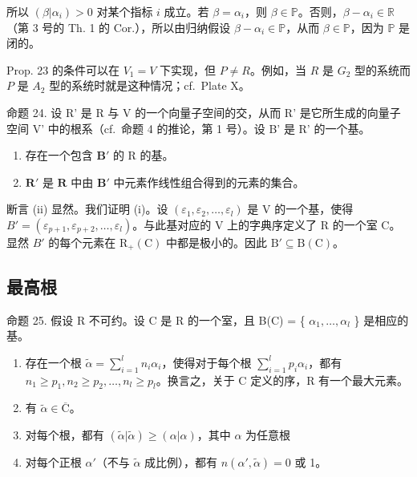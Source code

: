 所以 \((\beta |\alpha_{i}) > 0\) 对某个指标 \(i\) 成立。若 \(\beta = \alpha_{i}\)，则 \(\beta \in \mathbb{P}\)。否则，\(\beta - \alpha_{i} \in \mathbb{R}\)（第 3 号的 Th. 1 的 Cor.），所以由归纳假设 \(\beta - \alpha_{i} \in \mathbb{P}\)，从而 \(\beta \in \mathbb{P}\)，因为 \(\mathbb{P}\) 是闭的。

Prop. 23 的条件可以在 \(V_{1} = V\) 下实现，但 \(P \neq R\)。例如，当 \(R\) 是 \(G_{2}\) 型的系统而 \(P\) 是 \(A_{2}\) 型的系统时就是这种情况；cf.~Plate X。

命题 24. 设 R' 是 R 与 V 的一个向量子空间的交，从而 R' 是它所生成的向量子空间 V' 中的根系（cf.~命题 4 的推论，第 1 号）。设 B' 是 R' 的一个基。

\begin{enumerate}
\def\labelenumi{(\roman{enumi})}
\item
  存在一个包含 \(\mathbf{B}'\) 的 R 的基。
\item
  \(\mathbf{R}'\) 是 \(\mathbf{R}\) 中由 \(\mathbf{B}'\) 中元素作线性组合得到的元素的集合。
\end{enumerate}

断言 (ii) 显然。我们证明 (i)。设 \((\varepsilon_{1},\varepsilon_{2},\ldots,\varepsilon_{l})\) 是 V 的一个基，使得 \(B' = (\varepsilon_{p+1},\varepsilon_{p+2},\ldots,\varepsilon_{l})\)。与此基对应的 V 上的字典序定义了 R 的一个室 C。显然 \(B'\) 的每个元素在 \(\mathrm{R}_{+}(\mathrm{C})\) 中都是极小的。因此 \(\mathrm{B}' \subseteq \mathrm{B}(\mathrm{C})\)。

\subsection{最高根}

命题 25. 假设 R 不可约。设 C 是 R 的一个室，且 B(C) = \{ \(\alpha_{1}, \ldots, \alpha_{l}\) \} 是相应的基。

\begin{enumerate}
\def\labelenumi{(\roman{enumi})}
\item
  存在一个根 \(\tilde{\alpha} = \sum_{i=1}^{l} n_i \alpha_i\)，使得对于每个根 \(\sum_{i=1}^{l} p_i \alpha_i\)，都有 \(n_1 \geqslant p_1, n_2 \geqslant p_2, \ldots, n_l \geqslant p_l\)。换言之，关于 C 定义的序，R 有一个最大元素。
\item
  有 \(\tilde{\alpha} \in \overline{\mathrm{C}}\)。
\item
   对每个根，都有 \((\tilde{\alpha}|\tilde{\alpha})\geqslant (\alpha |\alpha)\)，其中 \(\alpha\) 为任意根
\item
  对每个正根 \(\alpha'\)（不与 \(\tilde{\alpha}\) 成比例），都有 \(n(\alpha', \tilde{\alpha}) = 0\) 或 1。
\end{enumerate}

